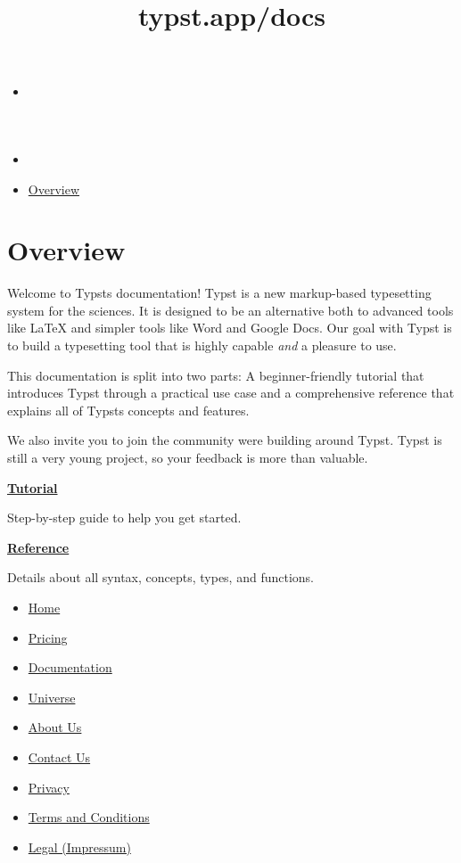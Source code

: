 \title{typst.app/docs}

\begin{itemize}
\tightlist
\item
  \href{/docs}{}
\item
  
\item
  \href{/docs/}{Overview}
\end{itemize}

\section{Overview}\label{overview}

Welcome to Typst\textquotesingle s documentation! Typst is a new
markup-based typesetting system for the sciences. It is designed to be
an alternative both to advanced tools like LaTeX and simpler tools like
Word and Google Docs. Our goal with Typst is to build a typesetting tool
that is highly capable \emph{and} a pleasure to use.

This documentation is split into two parts: A beginner-friendly tutorial
that introduces Typst through a practical use case and a comprehensive
reference that explains all of Typst\textquotesingle s concepts and
features.

We also invite you to join the community we\textquotesingle re building
around Typst. Typst is still a very young project, so your feedback is
more than valuable.

\href{/docs/tutorial}{
\textbf{Tutorial}}

Step-by-step guide to help you get started.

\href{/docs/reference}{
\textbf{Reference}}

Details about all syntax, concepts, types, and functions.

\begin{itemize}
\tightlist
\item
  \href{/}{Home}
\item
  \href{/pricing/}{Pricing}
\item
  \href{/docs/}{Documentation}
\item
  \href{/universe/}{Universe}
\item
  \href{/about/}{About Us}
\item
  \href{/contact/}{Contact Us}
\item
  \href{/privacy/}{Privacy}
\item
  \href{https://typst.app/terms}{Terms and Conditions}
\item
  \href{/legal/}{Legal (Impressum)}
\end{itemize}

